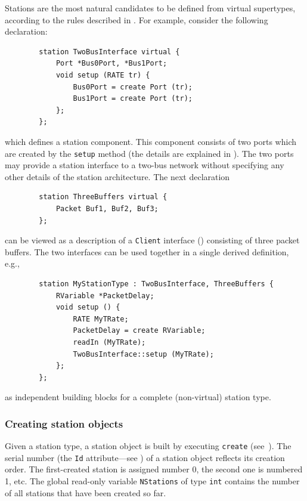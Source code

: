 Stations are the most natural candidates to be defined from virtual supertypes,
according to the rules described in .
For example, consider the following declaration:
\begin{verbatim}
        station TwoBusInterface virtual {
            Port *Bus0Port, *Bus1Port;
            void setup (RATE tr) {
                Bus0Port = create Port (tr);
                Bus1Port = create Port (tr);
            };
        };
\end{verbatim}
which defines a station component.
This component consists of two ports which are created by the {\tt setup}
method (the details are explained in ).
The two ports may provide a station interface to a two-bus network without
specifying any other details of the station architecture.
The next declaration
\begin{verbatim}
        station ThreeBuffers virtual {
            Packet Buf1, Buf2, Buf3;
        };
\end{verbatim}
can be viewed as a description of a {\tt Client} interface ()
consisting of three packet buffers.
The two interfaces can be used together in a single derived
definition, e.g.,
\begin{verbatim}
        station MyStationType : TwoBusInterface, ThreeBuffers {
            RVariable *PacketDelay;
            void setup () {
                RATE MyTRate;
                PacketDelay = create RVariable;
                readIn (MyTRate);
                TwoBusInterface::setup (MyTRate);
            };
        };
\end{verbatim}
as independent building blocks for a complete (non-virtual) station type.

\subsubsection{Creating station objects}
\label{rm_to_st_cs}

Given a station type, a station object is built by executing {\tt create}
(see~).
The serial number (the {\tt Id} attribute---see ) of a
station object reflects its creation order.
The first-created station is assigned number 0, the second one is numbered 1,
etc.
The global read-only variable {\tt NStations} of type {\tt int} contains
the number of all stations that have been created so far.

